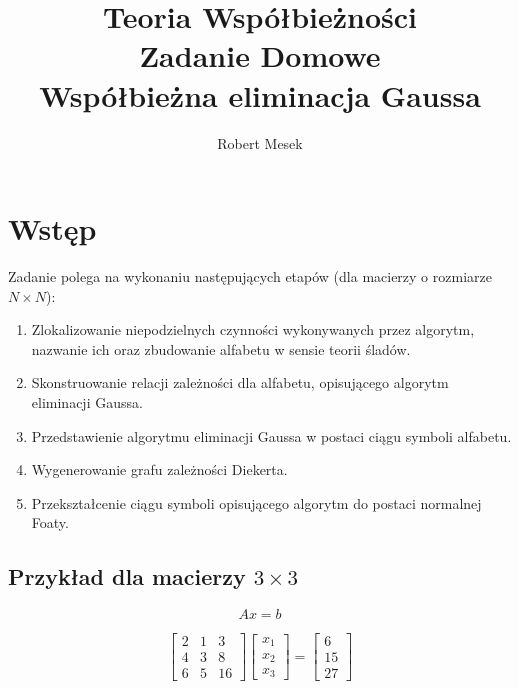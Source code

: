 \documentclass{article}
\title{Teoria Współbieżności \\ Zadanie Domowe \\ Współbieżna eliminacja Gaussa}
\author{Robert Mesek}
\date{}
\begin{document}
\maketitle
\tableofcontents

\newpage

\section{Wstęp}
Zadanie polega na wykonaniu następujących etapów (dla macierzy o rozmiarze $N \times N$):
\begin{enumerate}
    \item Zlokalizowanie niepodzielnych czynności wykonywanych przez algorytm,
          nazwanie ich oraz zbudowanie alfabetu w sensie teorii śladów.
    \item Skonstruowanie relacji zależności dla alfabetu, opisującego algorytm eliminacji Gaussa.
    \item Przedstawienie algorytmu eliminacji Gaussa w postaci ciągu symboli alfabetu.
    \item Wygenerowanie grafu zależności Diekerta.
    \item Przekształcenie ciągu symboli opisującego algorytm do postaci normalnej Foaty.
\end{enumerate}

\subsection{Przykład dla macierzy $3 \times 3$}
\begin{equation}
    A x = b
\end{equation}

\begin{equation}
    \begin{bmatrix}
        2 & 1 & 3  \\
        4 & 3 & 8  \\
        6 & 5 & 16
    \end{bmatrix}
    \begin{bmatrix}
        x_1 \\
        x_2 \\
        x_3
    \end{bmatrix}
    =
    \begin{bmatrix}
        6  \\
        15 \\
        27
    \end{bmatrix}
\end{equation}
\end{document}
